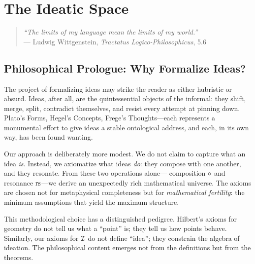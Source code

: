 

\chapter{The Ideatic Space}

\begin{quote}
\textit{``The limits of my language mean the limits of my world.''}\\
\hfill --- Ludwig Wittgenstein, \textit{Tractatus Logico-Philosophicus}, 5.6
\end{quote}

\section{Philosophical Prologue: Why Formalize Ideas?}

The project of formalizing ideas may strike the reader as either hubristic or
absurd. Ideas, after all, are the quintessential objects of the informal:
they shift, merge, split, contradict themselves, and resist every attempt at
pinning down. Plato's Forms, Hegel's Concepts, Frege's Thoughts---each
represents a monumental effort to give ideas a stable ontological address,
and each, in its own way, has been found wanting.

Our approach is deliberately more modest. We do not claim to capture what an
idea \emph{is}. Instead, we axiomatize what ideas \emph{do}: they compose
with one another, and they resonate. From these two operations alone---
composition $\circ$ and resonance $\mathrm{rs}$---we derive an unexpectedly rich
mathematical universe. The axioms are chosen not for metaphysical
completeness but for \emph{mathematical fertility}: the minimum assumptions
that yield the maximum structure.

This methodological choice has a distinguished pedigree. Hilbert's axioms for
geometry do not tell us what a ``point'' is; they tell us how points behave.
Similarly, our axioms for $\mathcal{I}$ do not define ``idea''; they constrain the
algebra of ideation. The philosophical content emerges not from the
definitions but from the theorems.

